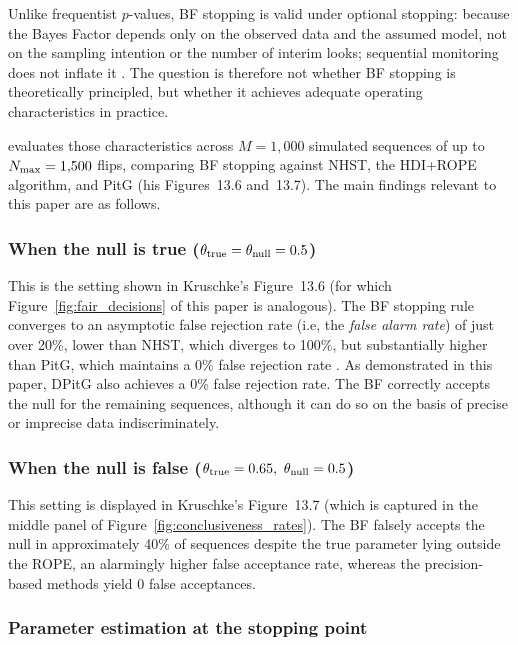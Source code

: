 Unlike frequentist $p$-values, BF stopping is valid under optional stopping: because
the Bayes Factor depends only on the observed data and the assumed model, not on the
sampling intention or the number of interim looks; sequential monitoring does not
inflate it \citep{rouder2014}.
The question is therefore not whether BF stopping is theoretically principled, but
whether it achieves adequate operating characteristics in practice.

\citet{kruschke2015doing} evaluates those characteristics across $M=1{,}000$ simulated
sequences of up to $N_{\rm max}=1{,}500$ flips, comparing BF stopping against NHST,
the HDI+ROPE algorithm, and PitG (his Figures~13.6 and~13.7).
The main findings relevant to this paper are as follows.

\subsubsection*{When the null is true ($\theta_{\rm true}=\theta_{\rm null}=0.5$)}

This is the setting shown in Kruschke's Figure~13.6 (for which
Figure~\ref{fig:fair_decisions} of this paper is analogous).
The BF stopping rule converges to an asymptotic false rejection rate
(i.e, the \textit{false alarm rate})
of just over 20\%, lower than NHST, which diverges to 100\%, but substantially higher
than PitG, which maintains a 0\% false rejection rate \citep{kruschke2015doing}.
As demonstrated in this paper, DPitG also achieves a 0\% false rejection rate.
The BF correctly accepts the null for the remaining sequences, although it can do
so on the basis of precise or imprecise data indiscriminately.

\subsubsection*{When the null is false ($\theta_{\rm true}=0.65, \ \theta_{\rm null}=0.5$)}

This setting is displayed in Kruschke's Figure~13.7 (which is captured in the middle
panel of Figure~\ref{fig:conclusiveness_rates}).
The BF falsely accepts the null in approximately 40\% of sequences despite the true
parameter lying outside the ROPE, an alarmingly higher false acceptance rate,
whereas the precision-based methods yield 0 false acceptances.

\subsubsection*{Parameter estimation at the stopping point}

